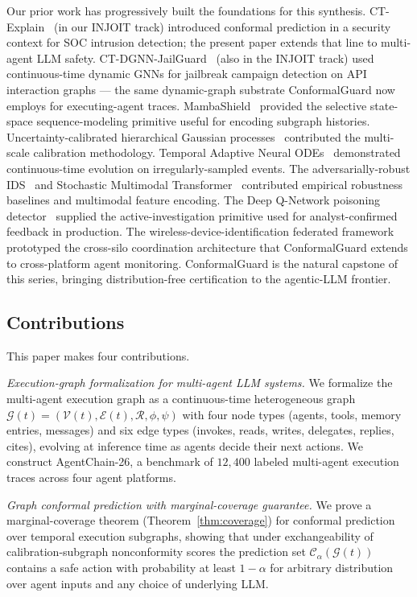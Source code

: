 \documentclass[12pt,a4paper]{article}
\theoremstyle{definition}
\theoremstyle{remark}
\newcommand{\modelname}{ConformalGuard}
\newcommand{\benchname}{AgentChain-26}
\newcommand{\Ccal}{\mathcal{C}}
\newcommand{\Vcal}{\mathcal{V}}
\newcommand{\Ecal}{\mathcal{E}}
\newcommand{\Gcal}{\mathcal{G}}
\newcommand{\Rcal}{\mathcal{R}}
\begin{document}
Our prior work has progressively built the foundations for this synthesis. CT-Explain~\cite{anaedevha2025mambashield_internal_pre} (in our INJOIT track) introduced conformal prediction in a security context for SOC intrusion detection; the present paper extends that line to multi-agent LLM safety. CT-DGNN-JailGuard~\cite{anaedevha2026robustidps_internal_pre} (also in the INJOIT track) used continuous-time dynamic GNNs for jailbreak campaign detection on API interaction graphs --- the same dynamic-graph substrate \modelname{} now employs for executing-agent traces. MambaShield~\cite{anaedevha2025mambashield} provided the selective state-space sequence-modeling primitive useful for encoding subgraph histories. Uncertainty-calibrated hierarchical Gaussian processes~\cite{anaedevha2026uchgp} contributed the multi-scale calibration methodology. Temporal Adaptive Neural ODEs~\cite{anaedevha2026tanode} demonstrated continuous-time evolution on irregularly-sampled events. The adversarially-robust IDS~\cite{anaedevha2024adversarial} and Stochastic Multimodal Transformer~\cite{anaedevha2025stochastic} contributed empirical robustness baselines and multimodal feature encoding. The Deep Q-Network poisoning detector~\cite{anaedevha2025dqn} supplied the active-investigation primitive used for analyst-confirmed feedback in production. The wireless-device-identification federated framework~\cite{anaedevha2024wireless} prototyped the cross-silo coordination architecture that \modelname{} extends to cross-platform agent monitoring. \modelname{} is the natural capstone of this series, bringing distribution-free certification to the agentic-LLM frontier.

\subsection{Contributions}

This paper makes four contributions.

\textit{Execution-graph formalization for multi-agent LLM systems.} We formalize the multi-agent execution graph as a continuous-time heterogeneous graph $\Gcal(t) = (\Vcal(t), \Ecal(t), \Rcal, \phi, \psi)$ with four node types (agents, tools, memory entries, messages) and six edge types (invokes, reads, writes, delegates, replies, cites), evolving at inference time as agents decide their next actions. We construct \benchname{}, a benchmark of $12{,}400$ labeled multi-agent execution traces across four agent platforms.

\textit{Graph conformal prediction with marginal-coverage guarantee.} We prove a marginal-coverage theorem (Theorem~\ref{thm:coverage}) for conformal prediction over temporal execution subgraphs, showing that under exchangeability of calibration-subgraph nonconformity scores the prediction set $\Ccal_\alpha(\Gcal(t))$ contains a safe action with probability at least $1-\alpha$ for arbitrary distribution over agent inputs and any choice of underlying LLM.
\end{document}
